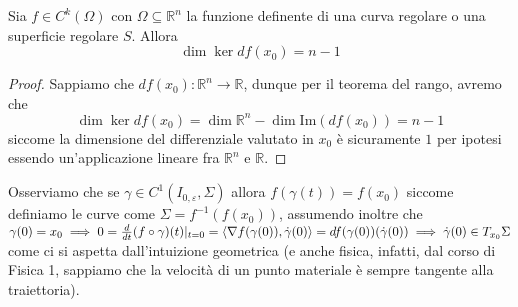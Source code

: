 \begin{prop}
Sia $f \in C^{k}(\Omega)$ con $\Omega \subseteq \mathbb{R}^n$ la funzione definente di una curva regolare o una superficie regolare $S$. Allora 
$$
\dim{\ker{df(x_0)}} = n-1
$$
\end{prop}
\begin{proof}
Sappiamo che $df(x_0): \mathbb{R}^n \to \mathbb{R}$, dunque per il teorema del rango, avremo che
$$
\dim{\ker{df(x_0)}} = \dim{\mathbb{R}^n} - \dim{\text{Im}(df(x_0))} = n - 1
$$
siccome la dimensione del differenziale valutato in $x_0$ è sicuramente $1$ per ipotesi essendo un'applicazione lineare fra $\mathbb{R}^n$ e $\mathbb{R}$.
\end{proof}
Osserviamo che se $\gamma \in C^1 (I_{0, \varepsilon}, \Sigma)$ allora $f(\gamma(t)) = f(x_0)$ siccome definiamo le curve come $\Sigma = f^{-1}(f(x_0))$, assumendo inoltre che $\gamma(0) = x_0 \implies 0 = \frac{d}{dt} (f \circ \gamma)(t)|_{t=0} = \langle \nabla f(\gamma(0)), \dot{\gamma}(0) \rangle = df(\gamma(0))(\dot{\gamma}(0)) \implies \dot{\gamma}(0) \in T_{x_0} \Sigma$ come ci si aspetta dall'intuizione geometrica (e anche fisica, infatti, dal corso di Fisica 1, sappiamo che la velocità di un punto materiale è sempre tangente alla traiettoria). 



